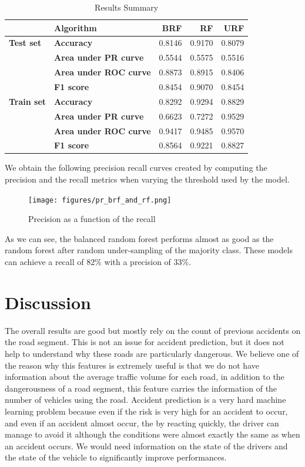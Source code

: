 \documentclass[conference]{IEEEtran}
\begin{document}
\begin{table}[htbp]
\caption{Results Summary}
\begin{center}
\begin{tabular}{|l|l|r|r|r|}
\hline
          & \textbf{Algorithm} &     BRF &      RF &     URF \\
\hline
\textbf{Test set} & \textbf{Accuracy} &  0.8146 &  0.9170 &  0.8079 \\
          & \textbf{Area under PR curve} &  0.5544 &  0.5575 &  0.5516 \\
          & \textbf{Area under ROC curve} &  0.8873 &  0.8915 &  0.8406 \\
          & \textbf{F1 score} &  0.8454 &  0.9070 &  0.8454 \\
\hline
\textbf{Train set} & \textbf{Accuracy} &  0.8292 &  0.9294 &  0.8829 \\
          & \textbf{Area under PR curve} &  0.6623 &  0.7272 &  0.9529 \\
          & \textbf{Area under ROC curve} &  0.9417 &  0.9485 &  0.9570 \\
          & \textbf{F1 score} &  0.8564 &  0.9221 &  0.8827 \\
\hline
\end{tabular}
\label{result summary}
\end{center}
\end{table}

We obtain the following precision recall curves created by computing the precision and the recall metrics when varying the threshold used by the model.

\begin{figure}[htbp]
\centerline{\texttt{[image: figures/pr\_brf\_and\_rf.png]}}
\caption{Precision as a function of the recall}
\label{precision recall rf}
\end{figure}

As we can see, the balanced random forest performs almost as good as the random forest after random under-sampling of the majority class. These models can achieve a recall of $82\%$ with a precision of $33\%$.

\section{Discussion}
The overall results are good but mostly rely on the count of previous accidents on the road segment.
This is not an issue for accident prediction, but it does not help to understand why these roads are particularly dangerous.
We believe one of the reason why this features is extremely useful is that we do not have information about the average traffic volume for each road, in addition to the dangerousness of a road segment, this feature carries the information of the number of vehicles using the road.
Accident prediction is a very hard machine learning problem because even if the risk is very high for an accident to occur, and even if an accident almost occur, the by reacting quickly, the driver can manage to avoid it although the conditions were almost exactly the same as when an accident occurs.
We would need information on the state of the drivers and the state of the vehicle to significantly improve performances.
\end{document}
